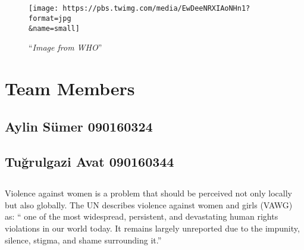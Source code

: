 \documentclass[
]{article}
\begin{document}
\hypertarget{section-1}{%
\subsection{}\label{section-1}}

\begin{figure}
\centering
\texttt{[image: https://pbs.twimg.com/media/EwDeeNRXIAoNHn1?format=jpg\\\&name=small]}
\caption{``\emph{Image from WHO}''}
\end{figure}

\hypertarget{section-2}{%
\subsection{}\label{section-2}}

\hypertarget{section-3}{%
\subsection{}\label{section-3}}

\hypertarget{team-members}{%
\section{Team Members}\label{team-members}}

\hypertarget{aylin-suxfcmer-090160324}{%
\subsection{Aylin Sümer 090160324}\label{aylin-suxfcmer-090160324}}

\hypertarget{tuux11frulgazi-avat-090160344}{%
\subsection{Tuğrulgazi Avat
090160344}\label{tuux11frulgazi-avat-090160344}}

\newpage  

\hypertarget{section-4}{%
\subsection{}\label{section-4}}

Violence against women is a problem that should be perceived not only
locally but also globally. The UN describes violence against women and
girls (VAWG) as: `` one of the most widespread, persistent, and
devastating human rights violations in our world today. It remains
largely unreported due to the impunity, silence, stigma, and shame
surrounding it.''
\end{document}
